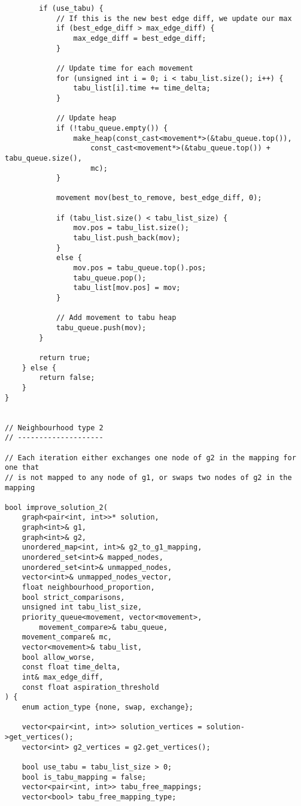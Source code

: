 \begin{lstlisting}
        if (use_tabu) {
            // If this is the new best edge diff, we update our max
            if (best_edge_diff > max_edge_diff) {
                max_edge_diff = best_edge_diff;
            }

            // Update time for each movement
            for (unsigned int i = 0; i < tabu_list.size(); i++) {
                tabu_list[i].time += time_delta;
            }

            // Update heap
            if (!tabu_queue.empty()) {
                make_heap(const_cast<movement*>(&tabu_queue.top()),
                    const_cast<movement*>(&tabu_queue.top()) + tabu_queue.size(),
                    mc);
            }

            movement mov(best_to_remove, best_edge_diff, 0);

            if (tabu_list.size() < tabu_list_size) {
                mov.pos = tabu_list.size();
                tabu_list.push_back(mov);
            }
            else {
                mov.pos = tabu_queue.top().pos;
                tabu_queue.pop();
                tabu_list[mov.pos] = mov;
            }

            // Add movement to tabu heap
            tabu_queue.push(mov);
        }

        return true;
    } else {
        return false;
    }
}


// Neighbourhood type 2
// --------------------

// Each iteration either exchanges one node of g2 in the mapping for one that
// is not mapped to any node of g1, or swaps two nodes of g2 in the mapping

bool improve_solution_2(
    graph<pair<int, int>>* solution,
    graph<int>& g1,
    graph<int>& g2,
    unordered_map<int, int>& g2_to_g1_mapping,
    unordered_set<int>& mapped_nodes,
    unordered_set<int>& unmapped_nodes,
    vector<int>& unmapped_nodes_vector,
    float neighbourhood_proportion,
    bool strict_comparisons,
    unsigned int tabu_list_size,
    priority_queue<movement, vector<movement>,
        movement_compare>& tabu_queue,
    movement_compare& mc,
    vector<movement>& tabu_list,
    bool allow_worse,
    const float time_delta,
    int& max_edge_diff,
    const float aspiration_threshold
) {
    enum action_type {none, swap, exchange};

    vector<pair<int, int>> solution_vertices = solution->get_vertices();
    vector<int> g2_vertices = g2.get_vertices();

    bool use_tabu = tabu_list_size > 0;
    bool is_tabu_mapping = false;
    vector<pair<int, int>> tabu_free_mappings;
    vector<bool> tabu_free_mapping_type;


\end{lstlisting}
